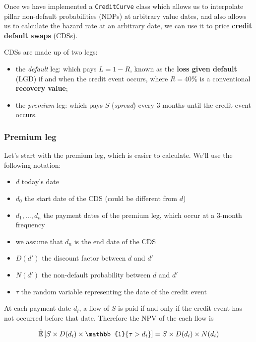 \documentclass[11pt]{article}
\providecommand{\tightlist}{%
      \setlength{\itemsep}{0pt}\setlength{\parskip}{0pt}}
\begin{document}
Once we have implemented a \texttt{CreditCurve} class which allows us to
interpolate pillar non-default probabilities (NDPs) at arbitrary value
dates, and also allows us to calculate the hazard rate at an arbitrary
date, we can use it to price \textbf{credit default swaps} (CDSs).

CDSs are made up of two legs:

\begin{itemize}
\tightlist
\item
  the \emph{default} leg: which pays \(L = 1 - R\), known as the
  \textbf{loss given default} (LGD) if and when the credit event occurs,
  where \(R = 40\%\) is a conventional \textbf{recovery value};
\item
  the \emph{premium} leg: which pays \(S\) (\emph{spread}) every 3
  months until the credit event occurs.
\end{itemize}

\hypertarget{premium-leg}{%
\subsubsection{Premium leg}\label{premium-leg}}

Let's start with the premium leg, which is easier to calculate. We'll
use the following notation:

\begin{itemize}
\tightlist
\item
  \(d\) today's date
\item
  \(d_0\) the start date of the CDS (could be different from \(d\))
\item
  \(d_1, ..., d_n\) the payment dates of the premium leg, which occur at
  a 3-month frequency
\item
  we assume that \(d_n\) is the end date of the CDS
\item
  \(D(d')\) the discount factor between \(d\) and \(d'\)
\item
  \(N(d')\) the non-default probability between \(d\) and \(d'\)
\item
  \(\tau\) the random variable representing the date of the credit event
\end{itemize}

At each payment date \(d_i\), a flow of \(S\) is paid if and only if the
credit event has not occurred before that date. Therefore the NPV of the
each flow is

\[
\def\E{\mathbb{E}}
\def\1{\mathbb{1}}
\def\set#1{\!\left\{ #1 \right\}}
\tilde\E\left[ S \times D(d_i) \times \1\set{\tau > d_i} \right] = S \times D(d_i) \times N(d_i)
\]
\end{document}
